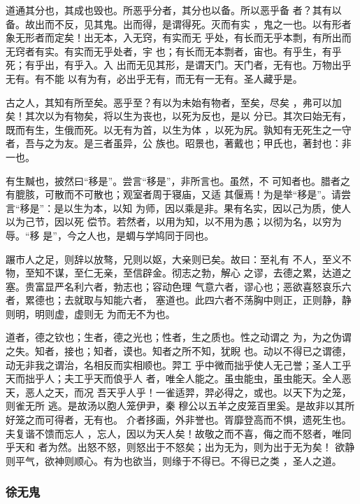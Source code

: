 \documentclass[]{article}
\begin{document}
道通其分也，其成也毁也。所恶乎分者，其分也以备。所以恶乎备
者？其有以备。故出而不反，见其鬼。出而得，是谓得死。灭而有实
，鬼之一也。以有形者象无形者而定矣！出无本，入无窍，有实而无
乎处，有长而无乎本剽，有所出而无窍者有实。有实而无乎处者，宇
也；有长而无本剽者，宙也。有乎生，有乎死；有乎出，有乎入。入
出而无见其形，是谓天门。天门者，无有也。万物出乎无有。有不能
以有为有，必出乎无有，而无有一无有。圣人藏乎是。

古之人，其知有所至矣。恶乎至？有以为未始有物者，至矣，尽矣
，弗可以加矣！其次以为有物矣，将以生为丧也，以死为反也，是以
分已。其次曰始无有，既而有生，生俄而死。以无有为首，以生为体
，以死为尻。孰知有无死生之一守者，吾与之为友。是三者虽异，公
族也。昭景也，著戴也；甲氏也，著封也：非一也。

有生黬也，披然曰``移是''。尝言``移是''，非所言也。虽然，不
可知者也。腊者之有膍胲，可散而不可散也；观室者周于寝庙，又适
其偃焉！为是举``移是''。请尝言``移是''：是以生为本，以知
为师，因以乘是非。果有名实，因以己为质，使人以为己节，因以死
偿节。若然者，以用为知，以不用为愚；以彻为名，以穷为辱。``移
是''，今之人也，是蜩与学鸠同于同也。

蹍市人之足，则辞以放骜，兄则以妪，大亲则已矣。故曰：至礼有
不人，至义不物，至知不谋，至仁无亲，至信辟金。彻志之勃，解心
之谬，去德之累，达道之塞。贵富显严名利六者，勃志也；容动色理
气意六者，谬心也；恶欲喜怒哀乐六者，累德也；去就取与知能六者，
塞道也。此四六者不荡胸中则正，正则静，静则明，明则虚，虚则无
为而无不为也。

道者，德之钦也；生者，德之光也；性者，生之质也。性之动谓之
为，为之伪谓之失。知者，接也；知者，谟也。知者之所不知，犹睨
也。动以不得已之谓德，动无非我之谓治，名相反而实相顺也。羿工
乎中微而拙乎使人无己誉；圣人工乎天而拙乎人；夫工乎天而俍乎人
者，唯全人能之。虽虫能虫，虽虫能天。全人恶天，恶人之天，而况
吾天乎人乎！一雀适羿，羿必得之，或也。以天下为之笼，则雀无所
逃。是故汤以胞人笼伊尹，秦
穆公以五羊之皮笼百里奚。是故非以其所好笼之而可得者，无有也。
介者拸画，外非誉也。胥靡登高而不惧，遗死生也。夫复谐不馈而忘人
，忘人，因以为天人矣！故敬之而不喜，侮之而不怒者，唯同乎天和
者为然。出怒不怒，则怒出于不怒矣；出为无为，则为出于无为矣！
欲静则平气，欲神则顺心。有为也欲当，则缘于不得已。不得已之类
，圣人之道。

\hypertarget{header-n892}{%
\subsubsection{徐无鬼}\label{header-n892}}
\end{document}
